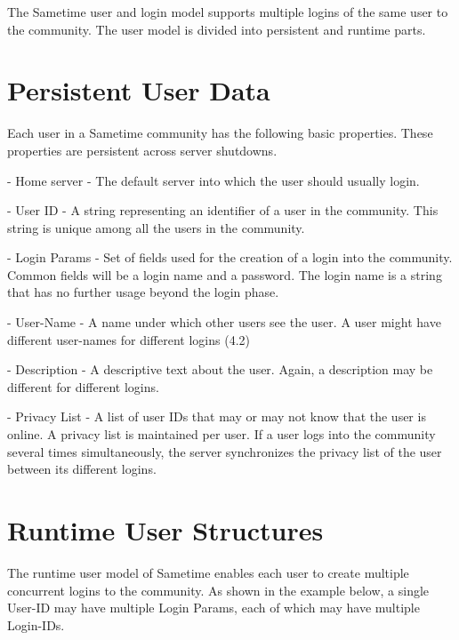 \documentclass[titlepage,oneside]{book}
\begin{document}
\par{} The Sametime user and login model supports multiple logins of
the same user to the community. The user model is divided into
persistent and runtime parts.

\section{Persistent User Data}

\par{} Each user in a Sametime community has the following basic
properties.  These properties are persistent across server shutdowns.

\par{} - Home server - The default server into which the user should
usually login.

\par{} - User ID - A string representing an identifier of a user in
the community. This string is unique among all the users in the
community.

\par{} - Login Params - Set of fields used for the creation of a login
into the community. Common fields will be a login name and a
password. The login name is a string that has no further usage beyond
the login phase.

\par{} - User-Name - A name under which other users see the user. A
user might have different user-names for different logins (4.2)

\par{} - Description - A descriptive text about the user. Again, a
description may be different for different logins.

\par{} - Privacy List - A list of user IDs that may or may not know
that the user is online. A privacy list is maintained per user. If a
user logs into the community several times simultaneously, the server
synchronizes the privacy list of the user between its different
logins.

\section{Runtime User Structures}

\par{} The runtime user model of Sametime enables each user to create
multiple concurrent logins to the community. As shown in the example
below, a single User-ID may have multiple Login Params, each of which
may have multiple Login-IDs.
\end{document}
